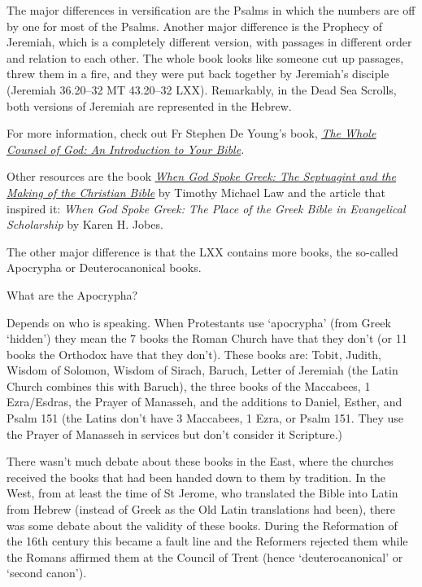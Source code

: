\documentclass[
]{article}
\begin{document}
The major differences in versification are the Psalms in which the
numbers are off by one for most of the Psalms. Another major difference
is the Prophecy of Jeremiah, which is a completely different version,
with passages in different order and relation to each other. The whole
book looks like someone cut up passages, threw them in a fire, and they
were put back together by Jeremiah's disciple (Jeremiah 36.20--32 MT
43.20--32 LXX). Remarkably, in the Dead Sea Scrolls, both versions of
Jeremiah are represented in the Hebrew.

For more information, check out Fr Stephen De Young's book,
\emph{\href{https://store.ancientfaith.com/the-whole-counsel-of-god/}{\ul{The
Whole Counsel of God: An Introduction to Your Bible}}.}

Other resources are the book
\emph{\href{https://www.amazon.com/When-God-Spoke-Greek-Septuagint/dp/0199781729}{\ul{When
God Spoke Greek: The Septuagint and the Making of the Christian Bible}}}
by Timothy Michael Law and the article that inspired it: \emph{When God
Spoke Greek: The Place of the Greek Bible in Evangelical Scholarship} by
Karen H. Jobes.

The other major difference is that the LXX contains more books, the
so-called Apocrypha or Deuterocanonical books.

What are the Apocrypha?

Depends on who is speaking. When Protestants use `apocrypha' (from Greek
`hidden') they mean the 7 books the Roman Church have that they don't
(or 11 books the Orthodox have that they don't). These books are: Tobit,
Judith, Wisdom of Solomon, Wisdom of Sirach, Baruch, Letter of Jeremiah
(the Latin Church combines this with Baruch), the three books of the
Maccabees, 1 Ezra/Esdras, the Prayer of Manasseh, and the additions to
Daniel, Esther, and Psalm 151 (the Latins don't have 3 Maccabees, 1
Ezra, or Psalm 151. They use the Prayer of Manasseh in services but
don't consider it Scripture.)

There wasn't much debate about these books in the East, where the
churches received the books that had been handed down to them by
tradition. In the West, from at least the time of St Jerome, who
translated the Bible into Latin from Hebrew (instead of Greek as the Old
Latin translations had been), there was some debate about the validity
of these books. During the Reformation of the 16th century this became a
fault line and the Reformers rejected them while the Romans affirmed
them at the Council of Trent (hence `deuterocanonical' or `second
canon').
\end{document}
